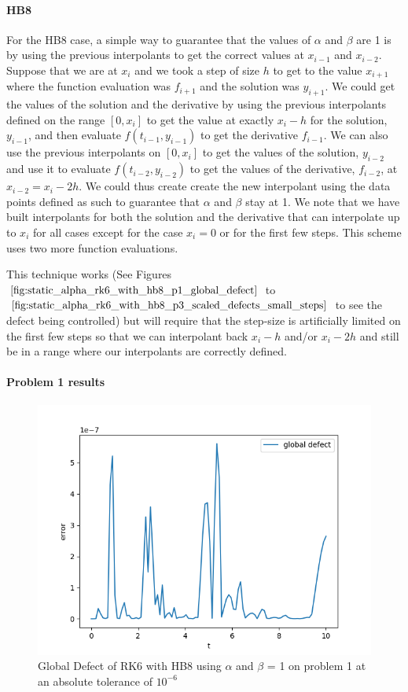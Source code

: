 \documentclass{article}
\begin{document}
\paragraph{HB8} For the HB8 case, a simple way to guarantee that the values of $\alpha$ and $\beta$ are 1 is by using the previous interpolants to get the correct values at $x_{i - 1}$ and $x_{i - 2}$. Suppose that we are at $x_i$ and we took a step of size $h$ to get to the value $x_{i + 1}$ where the function evaluation was $f_{i + 1}$ and the solution was $y_{i + 1}$. We could get the values of the solution and the derivative by using the previous interpolants defined on the range $[0, x_i]$ to get the value at exactly $x_i - h$ for the solution, $y_{i - 1}$, and then evaluate $f(t_{i-1}, y_{i-1})$ to get the derivative $f_{i - 1}$.  We can also use the previous interpolants on $[0, x_i]$ to get the values of the solution, $y_{i-2}$ and use it to evaluate $f(t_{i-2}, y_{i-2})$ to get the values of the derivative, $f_{i-2}$, at $x_{i-2} = x_i - 2h$. We could thus create create the new interpolant using the data points defined as such to guarantee that $\alpha$ and $\beta$ stay at 1. We note that we have built interpolants for both the solution and the derivative that  can interpolate up to $x_i$ for all cases except for the case $x_i = 0$ or for the first few steps. This scheme uses two more function evaluations.

This technique works (See Figures $\ref{fig:static_alpha_rk6_with_hb8_p1_global_defect}$ to $\ref{fig:static_alpha_rk6_with_hb8_p3_scaled_defects_small_steps}$ to see the defect being controlled) but will require that the step-size is artificially limited on the first few steps so that we can interpolant back $x_i - h$ and/or $x_i - 2h$ and still be in a range where our interpolants are correctly defined. 

\paragraph{Problem 1 results}
\begin{figure}[H]
\centering
\includegraphics[width=0.7\linewidth]{./figures/static_alpha_rk6_with_hb8_p1_global_defect}
\caption{Global Defect of RK6 with HB8 using $\alpha$ and $\beta$ = 1 on problem 1 at an absolute tolerance of $10^{-6}$}
\label{fig:static_alpha_rk6_with_hb8_p1_global_defect}
\end{figure}
\end{document}
